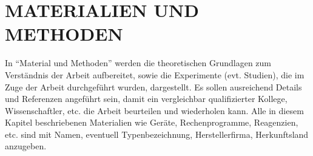 \documentclass[./\jobname.tex]{subfiles}
\begin{document}
%
\section{MATERIALIEN UND METHODEN}\raggedbottom
%
In \enquote{Material und Methoden} werden die theoretischen Grundlagen zum Verständnis der Arbeit aufbereitet, sowie die Experimente (evt. Studien), die im Zuge der Arbeit durchgeführt wurden, dargestellt. Es sollen ausreichend Details und Referenzen angeführt sein, damit ein vergleichbar qualifizierter Kollege, Wissenschaftler, etc. die Arbeit beurteilen und wiederholen kann. Alle in diesem Kapitel beschriebenen Materialien wie Geräte, Rechenprogramme, Reagenzien, etc. sind mit Namen, eventuell Typenbezeichnung, Herstellerfirma, Herkunftsland anzugeben.
%
\end{document}
